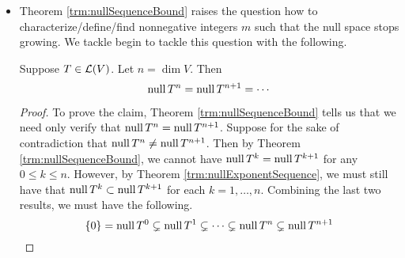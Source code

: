 \documentclass[../main.tex]{subfiles}
\begin{document}
\begin{itemize}
\begin{theorem}
\begin{proof}
            \begin{equation*}
                \nul T^{m+0} = \nul T^m = \nul T^{m+1} = \nul T^{m+0+1}
            \end{equation*}
            by hypothesis, as desired. Now suppose inductively that we have proven that $\nul T^{m+k-1}=\nul T^{m+k}$; we now wish to show that $\nul T^{m+k}=\nul T^{m+k+1}$. By Theorem \ref{trm:nullExponentSequence}, we have that $\nul T^{m+k}\subset\nul T^{m+k+1}$. On the other hand, suppose that $v\in\nul T^{m+k+1}$. Then
            \begin{equation*}
                0 = T^{m+k+1}v = T^{m+1}(T^kv)
            \end{equation*}
            But this implies that $T^kv\in\nul T^{m+1}=\nul T^m$ by hypothesis. Therefore,
            \begin{equation*}
                0 = T^m(T^kv) = T^{m+k}v
            \end{equation*}
            so $v\in\nul T^{m+k}$, as desired.
        \end{proof}
    \end{theorem}
    \item Theorem \ref{trm:nullSequenceBound} raises the question how to characterize/define/find nonnegative integers $m$ such that the null space stops growing. We tackle begin to tackle this question with the following.
    \begin{theorem}\label{trm:nullSequenceDimEnd}
        Suppose $T\in\mathcal{L}(V)$. Let $n=\dim V$. Then
        \begin{equation*}
            \operatorname{null} T^n = \operatorname{null} T^{n+1} = \cdots
        \end{equation*}
        \begin{proof}
            To prove the claim, Theorem \ref{trm:nullSequenceBound} tells us that we need only verify that $\operatorname{null} T^n=\operatorname{null} T^{n+1}$. Suppose for the sake of contradiction that $\operatorname{null} T^n\neq\operatorname{null} T^{n+1}$. Then by Theorem \ref{trm:nullSequenceBound}, we cannot have $\operatorname{null} T^k=\operatorname{null} T^{k+1}$ for any $0\leq k\leq n$. However, by Theorem \ref{trm:nullExponentSequence}, we must still have that $\operatorname{null} T^k\subset\operatorname{null} T^{k+1}$ for each $k=1,\dots,n$. Combining the last two results, we must have the following.
            \begin{equation*}
                \{0\} = \operatorname{null} T^0
                \subsetneq \operatorname{null} T^1
                \subsetneq \cdots
                \subsetneq \operatorname{null} T^n
                \subsetneq \operatorname{null} T^{n+1}
            \end{equation*}

\end{proof}
\end{theorem}
\end{itemize}
\end{document}
